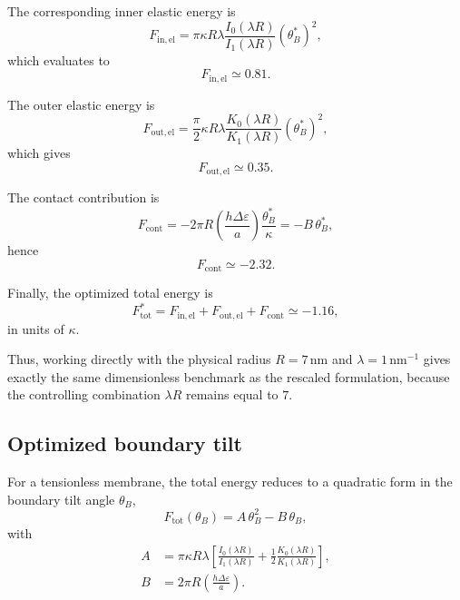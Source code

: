 \documentclass[11pt]{article}
\begin{document}
The corresponding inner elastic energy is
\begin{equation}
F_{\mathrm{in,el}}
=
\pi \kappa R \lambda
\frac{I_0(\lambda R)}{I_1(\lambda R)}
(\theta_B^*)^2,
\label{eq:Fin_unscaled}
\end{equation}
which evaluates to
\begin{equation}
F_{\mathrm{in,el}} \simeq 0.81.
\label{eq:Fin_value_unscaled}
\end{equation}

The outer elastic energy is
\begin{equation}
F_{\mathrm{out,el}}
=
\frac{\pi}{2}\kappa R \lambda
\frac{K_0(\lambda R)}{K_1(\lambda R)}
(\theta_B^*)^2,
\label{eq:Fout_unscaled}
\end{equation}
which gives
\begin{equation}
F_{\mathrm{out,el}} \simeq 0.35.
\label{eq:Fout_value_unscaled}
\end{equation}

The contact contribution is
\begin{equation}
F_{\mathrm{cont}}
=
-2\pi R \left(\frac{h\Delta\varepsilon}{a}\right)\frac{\theta_B^*}{\kappa}
=
-B\,\theta_B^*,
\label{eq:Fcont_unscaled}
\end{equation}
hence
\begin{equation}
F_{\mathrm{cont}} \simeq -2.32.
\label{eq:Fcont_value_unscaled}
\end{equation}

Finally, the optimized total energy is
\begin{equation}
F_{\mathrm{tot}}^*
=
F_{\mathrm{in,el}} + F_{\mathrm{out,el}} + F_{\mathrm{cont}}
\simeq -1.16,
\label{eq:Ftot_value_unscaled}
\end{equation}
in units of $\kappa$.

Thus, working directly with the physical radius $R=7\,\mathrm{nm}$ and
$\lambda = 1\,\mathrm{nm}^{-1}$ gives exactly the same dimensionless benchmark
as the rescaled formulation, because the controlling combination $\lambda R$
remains equal to $7$.

\subsection{Optimized boundary tilt}

For a tensionless membrane, the total energy reduces to a quadratic form
in the boundary tilt angle \(\theta_B\),
\begin{equation}
F_{\mathrm{tot}}(\theta_B)
=
A\,\theta_B^2 - B\,\theta_B ,
\end{equation}
with
\begin{align}
A &= \pi \kappa R \lambda
\left[
\frac{I_0(\lambda R)}{I_1(\lambda R)}
+
\frac{1}{2}
\frac{K_0(\lambda R)}{K_1(\lambda R)}
\right], \\
B &= 2\pi R \left( \frac{h \Delta\varepsilon}{a} \right).
\end{align}
\end{document}
